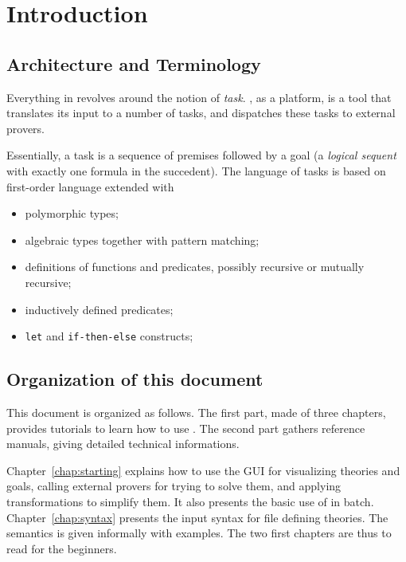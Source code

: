 
\chapter{Introduction}

\section{Architecture and Terminology}

Everything in \why revolves around the notion of
\emph{task}.  \why, as a platform, is a tool that
translates its input to a number of tasks, and dispatches these tasks
to external provers. 

Essentially, a task is a sequence of premises followed by a goal
(\ie a \emph{logical sequent} with exactly one formula in the
succedent). The language of tasks is based on first-order language
extended with 
\begin{itemize}
\item polymorphic types;
\item algebraic types together with pattern matching;
\item definitions of functions and predicates, possibly recursive or
  mutually recursive;
\item inductively defined predicates;
\item \texttt{let} and \texttt{if-then-else} constructs;
\end{itemize}


\section{Organization of this document}

This document is organized as follows. The first part, made of three chapters, provides tutorials to learn how to use \why. The second part gathers reference
manuals, giving detailed technical informations.

Chapter~\ref{chap:starting} explains how to use the GUI
for visualizing theories and goals, calling external provers for
trying to solve them, and applying transformations to simplify
them. It also presents the basic use of \why in
batch. Chapter~\ref{chap:syntax} presents the input syntax for file
defining \why theories. The semantics is given informally with
examples.  The two first chapters are thus to read for the beginners.

